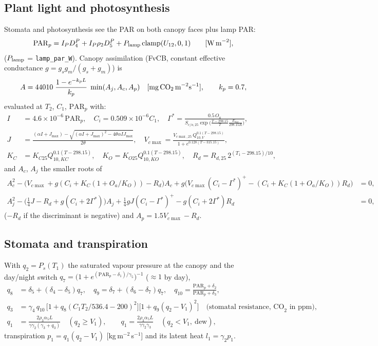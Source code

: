 \documentclass[11pt,a4paper]{article}
\newcommand{\code}[1]{\texttt{#1}}
\begin{document}
\subsection{Plant light and photosynthesis}\label{sec:photo}
Stomata and photosynthesis see the PAR on both canopy faces plus lamp PAR:
\begin{equation}
\mathrm{PAR}_p = I_PD_4^P + I_P\rho_2D_5^P + P_{\rm lamp}\,\mathrm{clamp}(U_{12},0,1)\qquad[\text{W\,m}^{-2}],
\end{equation}
($P_{\rm lamp}$ = \code{lamp\_par\_W}). Canopy assimilation (FvCB, constant effective conductance $g=g_sg_m/(g_s+g_m)$) is
\begin{equation}
A = 44010\;\frac{1-e^{-k_pL}}{k_p}\;\min(A_j,A_c,A_p)\quad[\text{mg\,\ce{CO2}\,m}^{-2}\text{s}^{-1}],\qquad k_p=0.7,
\end{equation}
evaluated at $T_2$, $C_1$, $\mathrm{PAR}_p$ with:
\begin{align}
I&=4.6\times10^{-6}\,\mathrm{PAR}_p,\quad C_i=0.509\times10^{-6}C_1,\quad
\Gamma^*=\frac{0.5\,O_a}{S_{c/o,25}\exp\bigl(\frac{T-298.15}{T}\frac{E_{Soc}}{298.15R}\bigr)},\\
J&=\frac{(\alpha I+J_{\max})-\sqrt{(\alpha I+J_{\max})^2-4\theta\alpha IJ_{\max}}}{2\theta},\quad
V_{c\max}=\frac{V_{c\max,25}\,Q_{10,V}^{0.1(T-298.15)}}{1+e^{0.128(T-315.15)}},\\
K_C&=K_{C25}Q_{10,KC}^{0.1(T-298.15)},\quad K_O=K_{O25}Q_{10,KO}^{0.1(T-298.15)},\quad R_d=R_{d,25}\,2^{(T_1-298.15)/10},
\end{align}
and $A_c$, $A_j$ the smaller roots of
\begin{align}
A_c^2-\bigl(V_{c\max}+g(C_i+K_C(1+O_a/K_O))-R_d\bigr)A_c+g\bigl(V_{c\max}(C_i-\Gamma^*)^+-(C_i+K_C(1+O_a/K_O))R_d\bigr)&=0,\\
A_j^2-\bigl(\tfrac14J-R_d+g(C_i+2\Gamma^*)\bigr)A_j+\tfrac14gJ(C_i-\Gamma^*)^+-g(C_i+2\Gamma^*)R_d&=0,
\end{align}
($-R_d$ if the discriminant is negative) and $A_p=1.5V_{c\max}-R_d$.

\subsection{Stomata and transpiration}
With $q_2=P_s(T_1)$ the saturated vapour pressure at the canopy and the day/night switch
$q_7=\bigl(1+e^{(\mathrm{PAR}_p-\delta_1)/\gamma_5}\bigr)^{-1}$ ($\approx1$ by day),
\begin{align}
q_8&=\delta_5+(\delta_4-\delta_5)q_7,\quad q_9=\delta_7+(\delta_6-\delta_7)q_7,\quad
q_{10}=\frac{\mathrm{PAR}_p+\delta_2}{\mathrm{PAR}_p+\delta_3},\\
q_3&=\gamma_4\,q_{10}\,\bigl[1+q_8(C_1T_2/536.4-200)^2\bigr]\bigl[1+q_9(q_2-V_1)^2\bigr]\quad\text{(stomatal resistance, CO}_2\text{ in ppm)},\\
q_1&=\frac{2\rho_3\alpha_5L}{\gamma\gamma_2(\gamma_3+q_3)}\quad(q_2\ge V_1),\qquad
q_1=\frac{2\rho_3\alpha_5L}{\gamma\gamma_2\gamma_3}\quad(q_2<V_1,\ \text{dew}),
\end{align}
transpiration $p_1=q_1(q_2-V_1)$ [kg\,m$^{-2}$\,s$^{-1}$] and its latent heat $l_1=\gamma_2p_1$.
\end{document}
